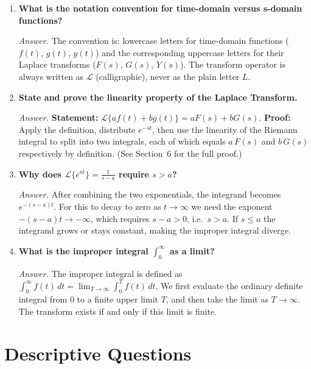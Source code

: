 \documentclass[12pt,a4paper]{article}
\begin{document}
\begin{enumerate}[leftmargin=1.5cm, label=\textbf{Q\arabic*.}]
  \item \textbf{What is the notation convention for time-domain versus
        s-domain functions?}

  \textit{Answer.}
  The convention is: lowercase letters for time-domain functions
  ($f(t)$, $g(t)$, $y(t)$) and the corresponding uppercase letters for their
  Laplace transforms ($F(s)$, $G(s)$, $Y(s)$). The transform operator is
  always written as $\mathcal{L}$ (calligraphic), never as the plain letter
  $L$.

  \item \textbf{State and prove the linearity property of the Laplace
        Transform.}

  \textit{Answer.}
  \textbf{Statement:} $\mathcal{L}\{af(t) + bg(t)\} = aF(s) + bG(s)$.
  \textbf{Proof:} Apply the definition, distribute $e^{-st}$, then use the
  linearity of the Riemann integral to split into two integrals, each of which
  equals $a\,F(s)$ and $b\,G(s)$ respectively by definition. (See Section~6
  for the full proof.)

  \item \textbf{Why does $\mathcal{L}\{e^{at}\} = \tfrac{1}{s-a}$ require
        $s > a$?}

  \textit{Answer.}
  After combining the two exponentials, the integrand becomes $e^{-(s-a)t}$.
  For this to decay to zero as $t \to \infty$ we need the exponent
  $-(s-a)t \to -\infty$, which requires $s - a > 0$, i.e.\ $s > a$.
  If $s \leq a$ the integrand grows or stays constant, making the improper
  integral diverge.

  \item \textbf{What is the improper integral $\int_0^\infty$ as a limit?}

  \textit{Answer.}
  The improper integral is defined as
  $\int_0^\infty f(t)\, dt = \lim_{T \to \infty} \int_0^T f(t)\, dt$.
  We first evaluate the ordinary definite integral from 0 to a finite upper
  limit $T$, and then take the limit as $T \to \infty$. The transform exists
  if and only if this limit is finite.

\end{enumerate}

\section{Descriptive Questions}
\end{document}
